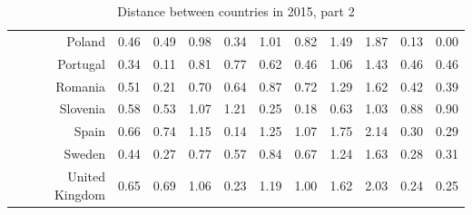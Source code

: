 \documentclass[a4paper,twoside,10pt]{article}
\begin{document}
\begin{table}[ht]
\begin{tabular}{r|rrrrrrrrrr}
			Poland & 0.46 & 0.49 & 0.98 & 0.34 & 1.01 & 0.82 & 1.49 & 1.87 & 0.13 & 0.00 \\
			Portugal & 0.34 & 0.11 & 0.81 & 0.77 & 0.62 & 0.46 & 1.06 & 1.43 & 0.46 & 0.46 \\
			Romania & 0.51 & 0.21 & 0.70 & 0.64 & 0.87 & 0.72 & 1.29 & 1.62 & 0.42 & 0.39 \\
			Slovenia & 0.58 & 0.53 & 1.07 & 1.21 & 0.25 & 0.18 & 0.63 & 1.03 & 0.88 & 0.90 \\
			Spain & 0.66 & 0.74 & 1.15 & 0.14 & 1.25 & 1.07 & 1.75 & 2.14 & 0.30 & 0.29 \\
			Sweden & 0.44 & 0.27 & 0.77 & 0.57 & 0.84 & 0.67 & 1.24 & 1.63 & 0.28 & 0.31 \\
			United Kingdom & 0.65 & 0.69 & 1.06 & 0.23 & 1.19 & 1.00 & 1.62 & 2.03 & 0.24 & 0.25 \\
			\hline
		\end{tabular}
		\caption{Distance between countries in 2015, part 2}

	\end{table}
	
\end{document}
